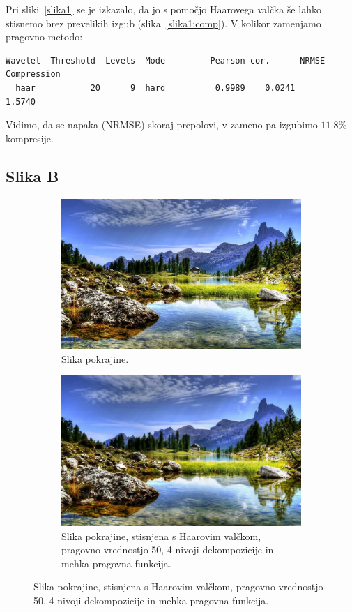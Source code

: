 \documentclass[a4paper,11pt]{article}
\begin{document}
Pri sliki~\ref{slika1} se je izkazalo, da jo s pomočjo Haarovega valčka še lahko stisnemo brez prevelikih izgub (slika~\ref{slika1:comp}). V kolikor zamenjamo pragovno metodo:
\begin{verbatim}
Wavelet  Threshold	Levels	Mode		 Pearson cor.	   NRMSE  Compression
  haar	         20	     9	hard	      0.9989    0.0241	   	  1.5740
\end{verbatim}
Vidimo, da se napaka (NRMSE) skoraj prepolovi, v zameno pa izgubimo $11.8\%$ kompresije.

\subsection{Slika B}

\begin{figure}
\centering
\begin{subfigure}[t]{0.8\textwidth}
\includegraphics[width=1\textwidth]{images/country.jpg}
\caption{Slika pokrajine.} \label{slika2}
\end{subfigure}
\centering
\begin{subfigure}[t]{0.8\textwidth}
\includegraphics[width=1\textwidth]{images/report/country_comp.jpg}
\caption{Slika pokrajine, stisnjena s Haarovim valčkom, pragovno vrednostjo 50, 4 nivoji dekompozicije in mehka pragovna funkcija.}
\label{slika2:comp}
\end{subfigure}
\end{figure}
\end{document}
